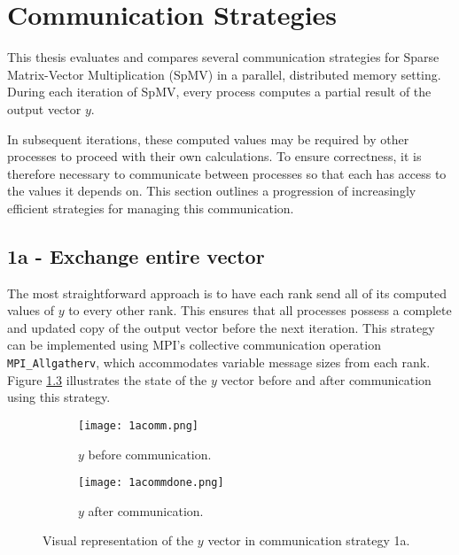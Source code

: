 \chapter{Communication Strategies}

This thesis evaluates and compares several communication strategies for Sparse Matrix-Vector Multiplication (SpMV) in a parallel, distributed memory setting. During each iteration of SpMV, every process computes a partial result of the output vector 
\(y\).
\medskip

In subsequent iterations, these computed values may be required by other processes to proceed with their own calculations. To ensure correctness, it is therefore necessary to communicate between processes so that each has access to the values it depends on. This section outlines a progression of increasingly efficient strategies for managing this communication.

\section{1a - Exchange entire vector}

The most straightforward approach is to have each rank send all of its computed values of 
\(y\) to every other rank. This ensures that all processes possess a complete and updated copy of the output vector before the next iteration. This strategy can be implemented using MPI’s collective communication operation \texttt{MPI\_Allgatherv}, which accommodates variable message sizes from each rank. Figure \ref{fig:1acomm} illustrates the state of the \(y\) vector before and after communication using this strategy.



\begin{figure}[H]
    \centering
    \begin{subfigure}[t]{0.45\textwidth}
        \centering
        \texttt{[image: 1acomm.png]}
        \caption{\(y\) before communication.}
        \label{fig:1acomm1}
    \end{subfigure}
    \hfill
    \begin{subfigure}[t]{0.45\textwidth}
        \centering
        \texttt{[image: 1acommdone.png]}
        \caption{\(y\) after communication.}
        \label{fig:1acomm2}
    \end{subfigure}
    \caption{Visual representation of the \(y\) vector in communication strategy 1a.}
    \label{fig:1acomm}
\end{figure}

